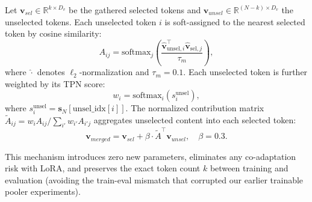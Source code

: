 \documentclass{article}
\newcommand{\sN}{\mathbf{s}_N}
\newcommand{\vsel}{\mathbf{v}_{sel}}
\newcommand{\vunsel}{\mathbf{v}_{unsel}}
\newcommand{\vmerged}{\mathbf{v}_{merged}}
\begin{document}
Let $\vsel \in \mathbb{R}^{k \times D_v}$ be the gathered selected tokens and
$\vunsel \in \mathbb{R}^{(N-k) \times D_v}$ the unselected tokens.
Each unselected token $i$ is soft-assigned to the nearest selected token by cosine similarity:
\begin{equation}
  A_{ij} = \mathrm{softmax}_j
  \!\left(\frac{\hat{\mathbf{v}}_{\mathrm{unsel},i}^\top \hat{\mathbf{v}}_{\mathrm{sel},j}}
               {\tau_m}\right), \label{eq:assign}
\end{equation}
where $\hat{\cdot}$ denotes $\ell_2$-normalization and $\tau_m{=}0.1$.
Each unselected token is further weighted by its TPN score:
\begin{equation}
  w_i = \mathrm{softmax}_i(s_i^{\mathrm{unsel}}), \label{eq:scoreweight}
\end{equation}
where $s_i^{\mathrm{unsel}} = \sN[\mathrm{unsel\_idx}[i]]$.
The normalized contribution matrix $\tilde{A}_{ij} = w_i A_{ij} /
\!\sum_{i'} w_{i'} A_{i'j}$ aggregates unselected content into each selected token:
\begin{equation}
  \vmerged = \vsel + \beta \cdot \tilde{A}^\top \vunsel, \quad \beta = 0.3.
  \label{eq:merge}
\end{equation}

This mechanism introduces zero new parameters, eliminates any co-adaptation risk with LoRA,
and preserves the exact token count $k$ between training and evaluation (avoiding the
train-eval mismatch that corrupted our earlier trainable pooler experiments).
\end{document}
